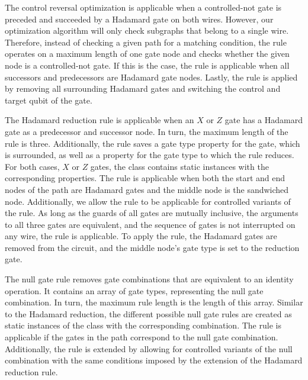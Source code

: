 The control reversal optimization is applicable when a controlled-not gate is preceded and succeeded by a Hadamard gate on both wires. However, our optimization algorithm will only check subgraphs that belong to a single wire. Therefore, instead of checking a given path for a matching condition, the rule operates on a maximum length of one gate node and checks whether the given node is a controlled-not gate. If this is the case, the rule is applicable when all successors and predecessors are Hadamard gate nodes. Lastly, the rule is applied by removing all surrounding Hadamard gates and switching the control and target qubit of the gate.

The Hadamard reduction rule is applicable when an $X$ or $Z$ gate has a Hadamard gate as a predecessor and successor node. In turn, the maximum length of the rule is three. Additionally, the rule saves a gate type property for the gate, which is surrounded, as well as a property for the gate type to which the rule reduces. For both cases, \ie $X$ or $Z$ gates, the class contains static instances with the corresponding properties. The rule is applicable when both the start and end nodes of the path are Hadamard gates and the middle node is the sandwiched node. Additionally, we allow the rule to be applicable for controlled variants of the rule. As long as the guards of all gates are mutually inclusive, the arguments to all three gates are equivalent, and the sequence of gates is not interrupted on any wire, the rule is applicable. To apply the rule, the Hadamard gates are removed from the circuit, and the middle node's gate type is set to the reduction gate.

The null gate rule removes gate combinations that are equivalent to an identity operation. It contains an array of gate types, representing the null gate combination. In turn, the maximum rule length is the length of this array. Similar to the Hadamard reduction, the different possible null gate rules are created as static instances of the class with the corresponding combination. The rule is applicable if the gates in the path correspond to the null gate combination. Additionally, the rule is extended by allowing for controlled variants of the null combination with the same conditions imposed by the extension of the Hadamard reduction rule.

